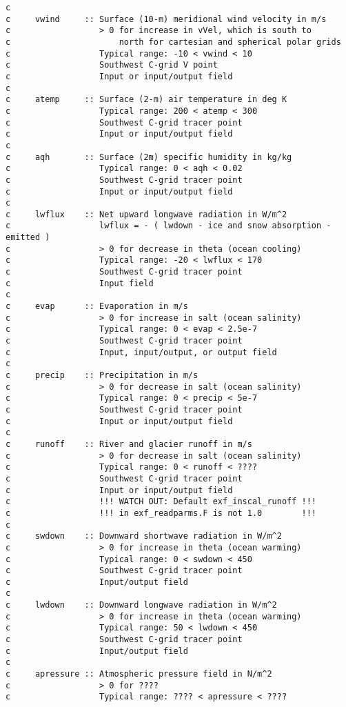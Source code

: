 {\begin{verbatim}
c
c     vwind     :: Surface (10-m) meridional wind velocity in m/s
c                  > 0 for increase in vVel, which is south to
c                      north for cartesian and spherical polar grids
c                  Typical range: -10 < vwind < 10
c                  Southwest C-grid V point
c                  Input or input/output field
c
c     atemp     :: Surface (2-m) air temperature in deg K
c                  Typical range: 200 < atemp < 300
c                  Southwest C-grid tracer point
c                  Input or input/output field
c
c     aqh       :: Surface (2m) specific humidity in kg/kg
c                  Typical range: 0 < aqh < 0.02
c                  Southwest C-grid tracer point
c                  Input or input/output field
c
c     lwflux    :: Net upward longwave radiation in W/m^2
c                  lwflux = - ( lwdown - ice and snow absorption - emitted )
c                  > 0 for decrease in theta (ocean cooling)
c                  Typical range: -20 < lwflux < 170
c                  Southwest C-grid tracer point
c                  Input field
c
c     evap      :: Evaporation in m/s
c                  > 0 for increase in salt (ocean salinity)
c                  Typical range: 0 < evap < 2.5e-7
c                  Southwest C-grid tracer point
c                  Input, input/output, or output field
c
c     precip    :: Precipitation in m/s
c                  > 0 for decrease in salt (ocean salinity)
c                  Typical range: 0 < precip < 5e-7
c                  Southwest C-grid tracer point
c                  Input or input/output field
c
c     runoff    :: River and glacier runoff in m/s
c                  > 0 for decrease in salt (ocean salinity)
c                  Typical range: 0 < runoff < ????
c                  Southwest C-grid tracer point
c                  Input or input/output field
c                  !!! WATCH OUT: Default exf_inscal_runoff !!!
c                  !!! in exf_readparms.F is not 1.0        !!!
c
c     swdown    :: Downward shortwave radiation in W/m^2
c                  > 0 for increase in theta (ocean warming)
c                  Typical range: 0 < swdown < 450
c                  Southwest C-grid tracer point
c                  Input/output field
c
c     lwdown    :: Downward longwave radiation in W/m^2
c                  > 0 for increase in theta (ocean warming)
c                  Typical range: 50 < lwdown < 450
c                  Southwest C-grid tracer point
c                  Input/output field
c
c     apressure :: Atmospheric pressure field in N/m^2
c                  > 0 for ????
c                  Typical range: ???? < apressure < ????

\end{verbatim}}

